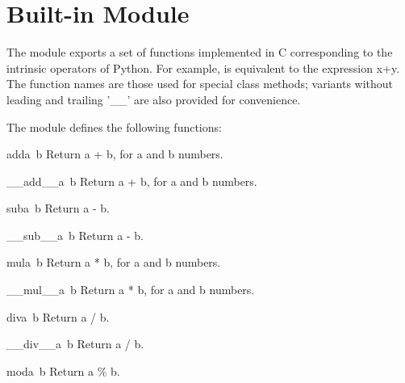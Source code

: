
\section{Built-in Module }	%

The  module exports a set of functions implemented in C
corresponding to the intrinsic operators of Python.  For example,
{} is equivalent to the expression x+y.  The
function names are those used for special class methods; variants without
leading and trailing '\_\_' are also provided for convenience.

The  module defines the following functions:

\renewcommand{\indexsubitem}{(in module operator)}

\begin{funcdesc}{add}{a\, b}
Return a + b, for a and b numbers.
\end{funcdesc}

\begin{funcdesc}{\_\_add\_\_}{a\, b}
Return a + b, for a and b numbers.
\end{funcdesc}

\begin{funcdesc}{sub}{a\, b}
Return a - b.
\end{funcdesc}

\begin{funcdesc}{\_\_sub\_\_}{a\, b}
Return a - b.
\end{funcdesc}

\begin{funcdesc}{mul}{a\, b}
Return a * b, for a and b numbers.
\end{funcdesc}

\begin{funcdesc}{\_\_mul\_\_}{a\, b}
Return a * b, for a and b numbers.
\end{funcdesc}

\begin{funcdesc}{div}{a\, b}
Return a / b.
\end{funcdesc}

\begin{funcdesc}{\_\_div\_\_}{a\, b}
Return a / b.
\end{funcdesc}

\begin{funcdesc}{mod}{a\, b}
Return a \% b.
\end{funcdesc}

